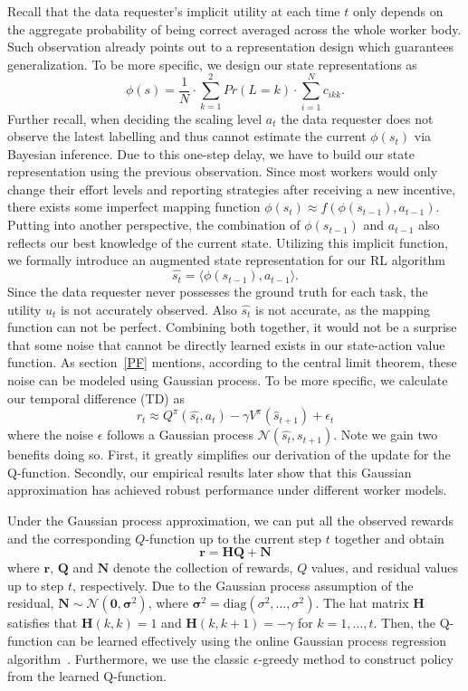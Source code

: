 Recall that the data requester's implicit utility at each time $t$ only depends on the aggregate probability of being correct averaged across the whole worker body. Such observation already points out to a  representation design which guarantees generalization. To be more specific, we design our state representations as 
$$
\phi(s) = \frac{1}{N} \cdot \sum_{k=1}^2 Pr(L=k) \cdot \sum_{i=1}^N c_{ikk}.
$$
Further recall, when deciding the scaling level $a_t$ the data requester does not observe the latest labelling and thus cannot estimate the current $\phi(s_t)$ via Bayesian inference. Due to this one-step delay, we have to build our state representation using the previous observation. Since most workers would only change their effort levels and reporting strategies after receiving a new incentive, there exists some imperfect mapping function $\phi(s_{t}) \approx f(\phi(s_{t-1}),a_{t-1})$. Putting into another perspective, the combination of $\phi(s_{t-1})$ and $a_{t-1}$ also reflects our best knowledge of the current state. Utilizing this implicit function, we formally introduce an augmented state representation for our RL algorithm
$$
\hat{s_t} = \langle \phi(s_{t-1}), a_{t-1} \rangle .
$$
Since the data requester never possesses the ground truth for each task, the utility $u_t$ is not accurately observed. Also $\hat{s_t}$ is not accurate, as the mapping function can not be perfect. Combining both together, it would not be a surprise that some noise that cannot be directly learned exists in our state-action value function. As section~\ref{PF} mentions, according to the central limit theorem, these noise can be modeled using Gaussian process. To be more specific, we calculate our temporal difference (TD) as 
$$
r_t \approx Q^\pi(\hat{s_t}, a_t) - \gamma V^\pi(\hat{s}_{t+1}) + \epsilon_t $$
where the noise $\epsilon $ follows a Gaussian process $\mathcal{N}(\hat{s_t},\hat{s_{t+1}})$. Note we gain two benefits doing so. First, it greatly simplifies our derivation of the update for the Q-function. Secondly, our empirical results later show that this Gaussian approximation has achieved robust performance under different worker models.  

Under the Gaussian process approximation, we can put all the observed rewards and the corresponding $Q$-function up to the current step $t$ together and obtain
\begin{equation}
\bm{r}=\bm{H}\bm{Q}+\bm{N}
\end{equation}
where $\bm{r}$, $\bm{Q}$ and $\bm{N}$ denote the collection of rewards, $Q$ values, and residual values up to step $t$, respectively.
Due to the Gaussian process assumption of the residual, $\bm{N}\sim \mathcal{N}(\bm{0},\bm{\sigma}^2)$, where $\bm{\sigma}^2=\textrm{diag}(\sigma^2,\ldots,\sigma^2)$.
The hat matrix $\bm{H}$ satisfies that $\bm{H}(k,k)=1$ and $\bm{H}(k,k+1)=-\gamma$ for $k=1,\ldots, t$.
Then, the Q-function can be learned effectively using the online Gaussian process regression algorithm~\cite{engel2005reinforcement}. Furthermore, we use the classic $\epsilon$-greedy method to construct policy from the learned Q-function.